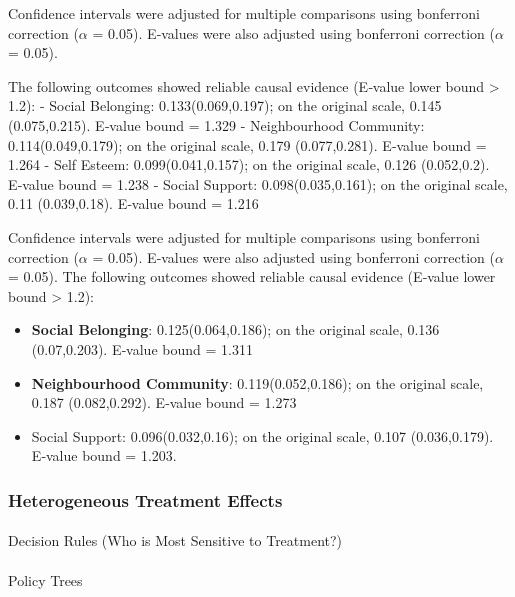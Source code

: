 \documentclass[
  single column]{article}
\makeatletter
\let\oldparagraph\paragraph
\renewcommand{\paragraph}{
    \@ifstar
      \xxxParagraphStar
      \xxxParagraphNoStar
  }
\newcommand{\xxxParagraphStar}[1]{\oldparagraph*{#1}\mbox{}}
\newcommand{\xxxParagraphNoStar}[1]{\oldparagraph{#1}\mbox{}}
\providecommand{\tightlist}{%
  \setlength{\itemsep}{0pt}\setlength{\parskip}{0pt}}
\makeatother
\begin{document}
\begin{longtable}[]
\end{longtable}

Confidence intervals were adjusted for multiple comparisons using
bonferroni correction (\(\alpha\) = 0.05). E‑values were also adjusted
using bonferroni correction (\(\alpha\) = 0.05).

The following outcomes showed reliable causal evidence (E‑value lower
bound \textgreater{} 1.2): - Social Belonging: 0.133(0.069,0.197); on
the original scale, 0.145 (0.075,0.215). E‑value bound = 1.329 -
Neighbourhood Community: 0.114(0.049,0.179); on the original scale,
0.179 (0.077,0.281). E‑value bound = 1.264 - Self Esteem:
0.099(0.041,0.157); on the original scale, 0.126 (0.052,0.2). E‑value
bound = 1.238 - Social Support: 0.098(0.035,0.161); on the original
scale, 0.11 (0.039,0.18). E‑value bound = 1.216

Confidence intervals were adjusted for multiple comparisons using
bonferroni correction (\(\alpha\) = 0.05). E‑values were also adjusted
using bonferroni correction (\(\alpha\) = 0.05). The following outcomes
showed reliable causal evidence (E‑value lower bound \textgreater{}
1.2):

\begin{itemize}
\tightlist
\item
  \textbf{Social Belonging}: 0.125(0.064,0.186); on the original scale,
  0.136 (0.07,0.203). E‑value bound = 1.311
\item
  \textbf{Neighbourhood Community}: 0.119(0.052,0.186); on the original
  scale, 0.187 (0.082,0.292). E‑value bound = 1.273
\item
  Social Support: 0.096(0.032,0.16); on the original scale, 0.107
  (0.036,0.179). E‑value bound = 1.203.
\end{itemize}

\newpage{}

\subsubsection{Heterogeneous Treatment
Effects}\label{heterogeneous-treatment-effects}

\paragraph{Decision Rules (Who is Most Sensitive to
Treatment?)}\label{decision-rules-who-is-most-sensitive-to-treatment}

\paragraph{Policy Trees}\label{policy-trees}
\end{document}
